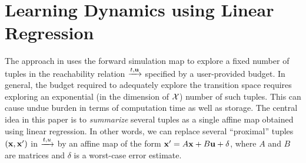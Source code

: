 




\section{Learning Dynamics using Linear Regression}

The approach in \cite{zutshi2014multiple} uses the forward simulation
map to explore a fixed number of tuples in the reachability relation
$\xrightarrow{t,\mathbf{u}}$ specified by a user-provided budget.  In general, the
budget required to adequately explore the transition space requires
exploring an exponential (in the dimension of $\mathcal{X}$) number
of such tuples. This can cause undue burden in terms of computation
time as well as storage.  The central idea in this paper is to {\em
summarize} several tuples as a single affine map obtained using linear
regression.  In other words, we can replace several ``proximal''
tuples $(\mathbf{x},\mathbf{x}')$ in $\xrightarrow{t,u}$ by an affine map of the form
$\mathbf{x}' = A\mathbf{x} + B\mathbf{u} + \delta$, where $A$ and $B$ are matrices and
$\delta$ is a worst-case error estimate.

